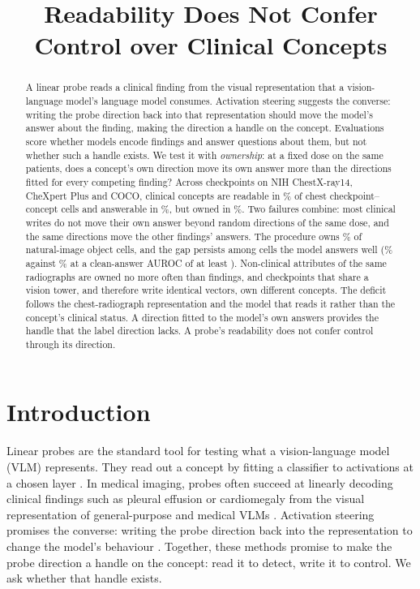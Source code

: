 \documentclass{article}
\title{Readability Does Not Confer Control over Clinical Concepts}
\begin{document}
\maketitle

\begin{abstract}
A linear probe reads a clinical finding from the visual representation that a vision-language model's language model consumes. Activation steering suggests the converse: writing the probe direction back into that representation should move the model's answer about the finding, making the direction a handle on the concept. Evaluations score whether models encode findings and answer questions about them, but not whether such a handle exists. We test it with \emph{ownership}: at a fixed dose on the same patients, does a concept's own direction move its own answer more than the directions fitted for every competing finding? Across \cfCheckpoints{} checkpoints on NIH ChestX-ray14, CheXpert Plus and COCO, clinical concepts are readable in \cfChestReadablePct{}\% of chest checkpoint--concept cells and answerable in \cfChestAnswerablePct{}\%, but owned in \cfChestOwnedPct{}\%. Two failures combine: most clinical writes do not move their own answer beyond random directions of the same dose, and the same directions move the other findings' answers. The procedure owns \cfCocoOwnedPct{}\% of natural-image object cells, and the gap persists among cells the model answers well (\cfStratChestTopPct{}\% against \cfStratNatTopPct{}\% at a clean-answer AUROC of at least \cfStratTopEdge{}). Non-clinical attributes of the same radiographs are owned no more often than findings, and checkpoints that share a vision tower, and therefore write identical vectors, own different concepts. The deficit follows the chest-radiograph representation and the model that reads it rather than the concept's clinical status. A direction fitted to the model's own answers provides the handle that the label direction lacks. A probe's readability does not confer control through its direction.
\end{abstract}

\section{Introduction}
\label{sec:introduction}

Linear probes are the standard tool for testing what a vision-language model (VLM) represents. They read out a concept by fitting a classifier to activations at a chosen layer \citep{alain2017understanding,belinkov2022probing}. In medical imaging, probes often succeed at linearly decoding clinical findings such as pleural effusion or cardiomegaly from the visual representation of general-purpose and medical VLMs \citep{zhu2026lost,pedersen2026probes}. Activation steering promises the converse: writing the probe direction back into the representation to change the model's behaviour \citep{turner2023steering,panickssery2024caa}. Together, these methods promise to make the probe direction a handle on the concept: read it to detect, write it to control. We ask whether that handle exists.
\end{document}
